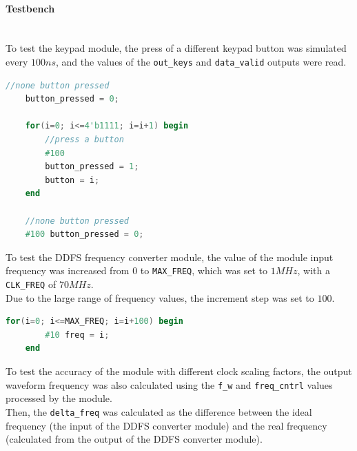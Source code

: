 \paragraph{Testbench} \quad \\
To test the keypad module, the press of a different keypad button was simulated every \(100ns\), and the values of the \texttt{out\_keys} and \texttt{data\_valid} outputs were read.

\vspace{1cm}
\begin{lstlisting}[language=Verilog, caption=Keypad module testbench  ]
    //none button pressed
    button_pressed = 0;
    
    for(i=0; i<=4'b1111; i=i+1) begin
        //press a button
        #100
        button_pressed = 1;
        button = i;		
    end
    
    //none button pressed
    #100 button_pressed = 0;
\end{lstlisting}
\vspace{1cm}

\noindent
To test the DDFS frequency converter module, the value of the module input frequency was increased from \(0\) to \texttt{MAX\_FREQ}, which was set to \(1MHz\), with a \texttt{CLK\_FREQ} of \(70MHz\). \\
Due to the large range of frequency values, the increment step was set to \(100\).

\vspace{1cm}
\begin{lstlisting}[language=Verilog, caption=DDFS converter module testbench  ]
    for(i=0; i<=MAX_FREQ; i=i+100) begin
        #10 freq = i;
    end
\end{lstlisting}
\vspace{1cm}

\noindent
To test the accuracy of the module with different clock scaling factors, the output waveform frequency was also calculated using the \texttt{f\_w} and \texttt{freq\_cntrl} values processed by the module. \\
Then, the \texttt{delta\_freq} was calculated as the difference between the ideal frequency (the input of the DDFS converter module) and the real frequency (calculated from the output of the DDFS converter module).

